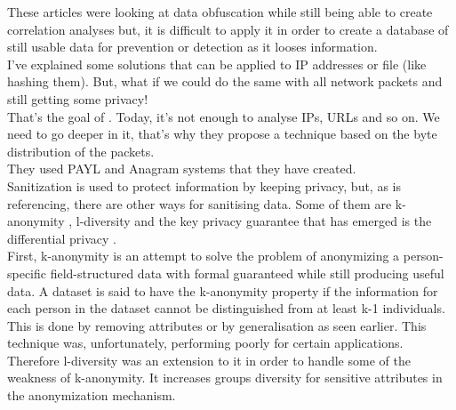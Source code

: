 \documentclass{eplmastersthesis}
\begin{document}
These articles were looking at data obfuscation while still being able to create correlation analyses but, it is difficult to apply it in order to create a database of still usable data for prevention or detection as it looses information.
\\

I've explained some solutions that can be applied to IP addresses or file (like hashing them). But, what if we could do the same with all network packets and still getting some privacy!\\
That's the goal of \cite{parekh2006privacy}. Today, it's not enough to analyse IPs, URLs and so on. We need to go deeper in it, that's why they propose a technique based on the byte distribution of the packets.\\
They used PAYL and Anagram \cite{wang2006network} systems that they have created.\\

Sanitization is used to protect information by keeping privacy, but, as \cite{mohaisen2017rethinking} is referencing, there are other ways for sanitising data. Some of them are k-anonymity \cite{sweeney2002k}, l-diversity \cite{machanavajjhala2007diversity} and the key privacy guarantee that has emerged is the differential privacy \cite{dwork2008differential}.\\
First, k-anonymity is an attempt to solve the problem of anonymizing a person-specific field-structured data with formal guaranteed while still producing useful data. A dataset is said to have the k-anonymity property if the information for each person in the dataset cannot be distinguished from at least k-1 individuals. This is done by removing attributes or by generalisation as seen earlier. This technique was, unfortunately, performing poorly for certain applications. Therefore l-diversity was an extension to it in order to handle some of the weakness of k-anonymity. It increases groups diversity for sensitive attributes in the anonymization mechanism.\\
\end{document}
